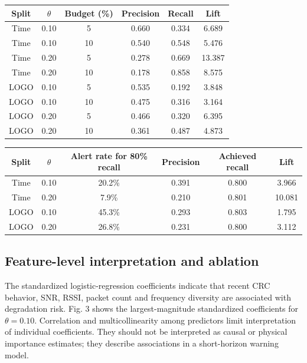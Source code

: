 \documentclass{jot}
\begin{document}
\begin{table}[t]
\setcounter{table}{5}
\centering
\begin{tabular}{@{}cccccc@{}}
\toprule
Split & $\theta$ & Budget (\%) & Precision & Recall & Lift \\
\midrule
Time & 0.10 & 5 & 0.660 & 0.334 & 6.689 \\
Time & 0.10 & 10 & 0.540 & 0.548 & 5.476 \\
Time & 0.20 & 5 & 0.278 & 0.669 & 13.387 \\
Time & 0.20 & 10 & 0.178 & 0.858 & 8.575 \\
LOGO & 0.10 & 5 & 0.535 & 0.192 & 3.848 \\
LOGO & 0.10 & 10 & 0.475 & 0.316 & 3.164 \\
LOGO & 0.20 & 5 & 0.466 & 0.320 & 6.395 \\
LOGO & 0.20 & 10 & 0.361 & 0.487 & 4.873 \\
\bottomrule
\end{tabular}
\end{table}

\begin{table}[t]
\centering
\begin{tabular}{@{}cccccc@{}}
\toprule
Split & $\theta$ & Alert rate for 80\% recall & Precision & Achieved recall & Lift \\
\midrule
Time & 0.10 & 20.2\% & 0.391 & 0.800 & 3.966 \\
Time & 0.20 & 7.9\% & 0.210 & 0.801 & 10.081 \\
LOGO & 0.10 & 45.3\% & 0.293 & 0.803 & 1.795 \\
LOGO & 0.20 & 26.8\% & 0.231 & 0.800 & 3.112 \\
\bottomrule
\end{tabular}
\end{table}

\subsection{Feature-level interpretation and ablation}\label{s:4.5}
The standardized logistic-regression coefficients indicate that recent CRC behavior, SNR, RSSI, packet count and frequency diversity are associated with degradation risk. Fig. 3 shows the largest-magnitude standardized coefficients for $\theta = 0.10$. Correlation and multicollinearity among predictors limit interpretation of individual coefficients. They should not be interpreted as causal or physical importance estimates; they describe associations in a short-horizon warning model.
\end{document}
